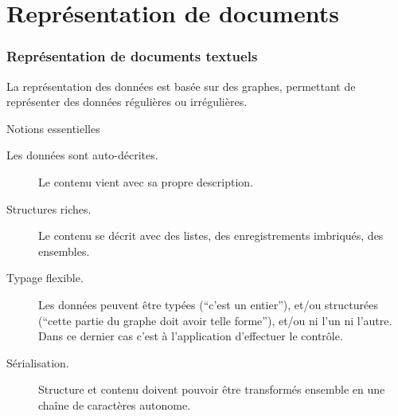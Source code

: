 


\section{Représentation de documents}

\begin{frame}
\frametitle{Représentation de documents textuels}

La représentation des données est basée sur des \alert{graphes}, permettant de représenter des
données régulières ou irrégulières.

\vfill

\alert{Notions essentielles}

\begin{description}
  \item[Les données sont auto-décrites.] Le contenu vient avec sa propre
  description.
  
 \item[Structures riches.] Le contenu se décrit avec des listes, des
 enregistrements imbriqués, des ensembles.

  \item[Typage flexible.] Les données peuvent être typées (``c'est un entier''),
  et/ou structurées (``cette partie du graphe \alert{doit} avoir telle forme''), et/ou ni l'un ni
  l'autre. Dans ce dernier cas c'est à l'application d'effectuer le contrôle.
 
   \item[Sérialisation.] Structure \alert{et} contenu doivent pouvoir être transformés
      ensemble en une chaîne de caractères autonome.

\end{description}

\end{frame}

